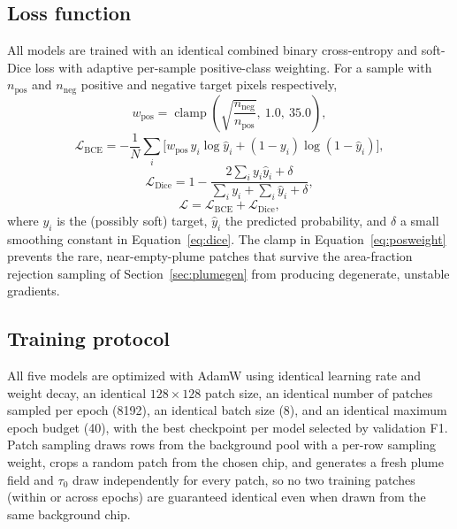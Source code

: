 \documentclass[10pt,twocolumn]{article}
\begin{document}
\FloatBarrier
\subsection{Loss function}

All models are trained with an identical combined binary cross-entropy and soft-Dice loss with adaptive per-sample positive-class weighting. For a sample with $n_{\text{pos}}$ and $n_{\text{neg}}$ positive and negative target pixels respectively,
\begin{equation}
w_{\text{pos}} = \operatorname{clamp}\!\left(\sqrt{\frac{n_{\text{neg}}}{n_{\text{pos}}}},\ 1.0,\ 35.0\right),
\label{eq:posweight}
\end{equation}
\begin{equation}
\mathcal{L}_{\text{BCE}} = -\frac{1}{N}\sum_i \Big[w_{\text{pos}}\,y_i\log \hat y_i + (1-y_i)\log(1-\hat y_i)\Big],
\label{eq:bce}
\end{equation}
\begin{equation}
\mathcal{L}_{\text{Dice}} = 1 - \frac{2\sum_i y_i \hat y_i + \delta}{\sum_i y_i + \sum_i \hat y_i + \delta},
\label{eq:dice}
\end{equation}
\begin{equation}
\mathcal{L} = \mathcal{L}_{\text{BCE}} + \mathcal{L}_{\text{Dice}},
\label{eq:totalloss}
\end{equation}
where $y_i$ is the (possibly soft) target, $\hat y_i$ the predicted probability, and $\delta$ a small smoothing constant in Equation~\eqref{eq:dice}. The clamp in Equation~\eqref{eq:posweight} prevents the rare, near-empty-plume patches that survive the area-fraction rejection sampling of Section~\ref{sec:plumegen} from producing degenerate, unstable gradients.

\subsection{Training protocol}

All five models are optimized with AdamW \citep{loshchilov2019decoupled} using identical learning rate and weight decay, an identical $128\times128$ patch size, an identical number of patches sampled per epoch (8192), an identical batch size (8), and an identical maximum epoch budget (40), with the best checkpoint per model selected by validation F1. Patch sampling draws rows from the background pool with a per-row sampling weight, crops a random patch from the chosen chip, and generates a fresh plume field and $\tau_0$ draw independently for every patch, so no two training patches (within or across epochs) are guaranteed identical even when drawn from the same background chip.
\end{document}
